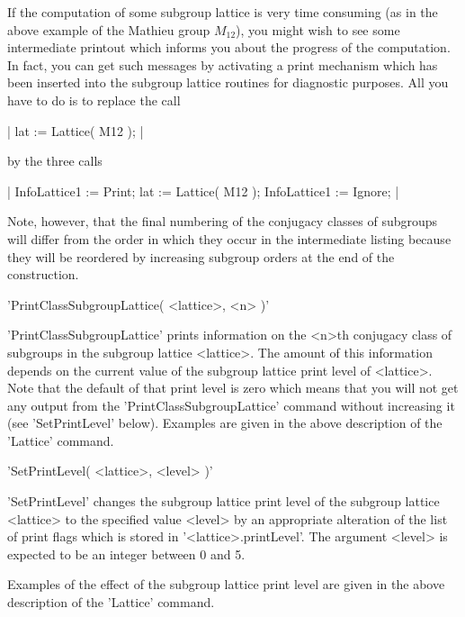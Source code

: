 If the computation of some subgroup lattice is very time consuming (as in
the above example of the  Mathieu group $M_{12}$), you might wish to  see
some intermediate printout which informs you about the  progress  of  the
computation.  In fact, you  can get such messages  by activating a  print
mechanism which has been inserted  into the subgroup lattice routines for
diagnostic purposes. All you have to do is to replace the call

|    lat := Lattice( M12 ); |

by the three calls

|    InfoLattice1 := Print;
    lat := Lattice( M12 );
    InfoLattice1 := Ignore; |

Note,  however, that  the  final  numbering of  the  conjugacy classes of
subgroups will  differ  from  the  order  in  which  they  occur  in  the
intermediate  listing  because  they  will  be  reordered  by  increasing
subgroup orders at the end of the construction.

\vspace{5mm}
'PrintClassSubgroupLattice( <lattice>, <n> )'%

'PrintClassSubgroupLattice' prints  information on  the  <n>th  conjugacy
class  of subgroups in the subgroup lattice <lattice>. The amount of this
information depends on  the  current value of the subgroup  lattice print
level of  <lattice>.  Note that the default of  that print  level is zero
which   means   that   you   will   not   get   any   output   from   the
'PrintClassSubgroupLattice'   command   without   increasing   it    (see
'SetPrintLevel'  below).  Examples are given in  the above description of
the 'Lattice' command.

\vspace{5mm}
'SetPrintLevel( <lattice>, <level> )'%

'SetPrintLevel' changes the subgroup  lattice print level of the subgroup
lattice  <lattice> to  the   specified value  <level> by   an appropriate
alteration    of   the  list  of   print    flags   which   is stored  in
'<lattice>.printLevel'.    The  argument <level> is    expected  to be an
integer between 0 and 5.

Examples  of the effect of the  subgroup lattice print level are given in
the above description of the 'Lattice' command.


